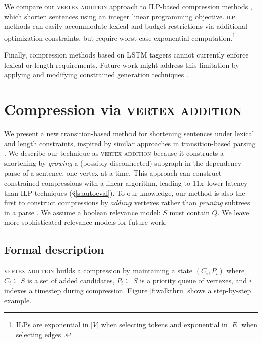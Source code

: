 \documentclass[11pt,a4paper]{article}
\newcommand{\speedup}[0]{11x~}
\begin{document}
We compare our \textsc{vertex addition} approach to ILP-based compression methods \cite{clarke2008global,filippova2013overcoming,Wang2017CanSH}, which shorten sentences using an integer linear programming objective. \textsc{ilp} methods can easily accommodate lexical and budget restrictions via additional optimization constraints, but require worst-case exponential computation.\footnote{ILPs are exponential in $|V|$ when selecting tokens \cite{clarke2008global} and exponential in $|E|$ when selecting edges \cite{filippova2015sentence}.} 

Finally, compression methods based on LSTM taggers \cite{filippova2015sentence} cannot currently enforce lexical or length requirements. Future work might address this limitation by applying and modifying constrained generation techniques \cite{D16-1140,N18-1119,D18-1443}.

\section{Compression via \textsc{vertex addition}}\label{s:system}

We present a new transition-based method for shortening sentences under lexical and length constraints, inspired by similar approaches in transition-based parsing \cite{nivre2003}. We describe our technique as \textsc{vertex addition} because it constructs a shortening by \textit{growing} a (possibly disconnected) subgraph in the dependency parse of a sentence, one vertex at a time. This approach can construct constrained compressions with a linear algorithm, leading to \speedup lower latency than ILP techniques (\S\ref{s:autoeval}). To our knowledge, our method is also the first to construct compressions by $\textit{adding}$ vertexes rather than \textit{pruning} subtrees in a parse \cite{Knight2000StatisticsBasedS,almeida2013fast,Filippova2015FastKS}. We assume a boolean relevance model: $S$ must contain $Q$. We leave more sophisticated relevance models for future work.

\subsection{Formal description}\label{s:formal}

\textsc{vertex addition} builds a compression by maintaining a state
$(C_i,P_i)$ where $C_i \subseteq S$ is a set of added candidates, $P_i  \subseteq S$ is a priority queue of vertexes, and $i$ indexes a timestep during compression. Figure \ref{f:walkthru} shows a step-by-step example. 
\end{document}
